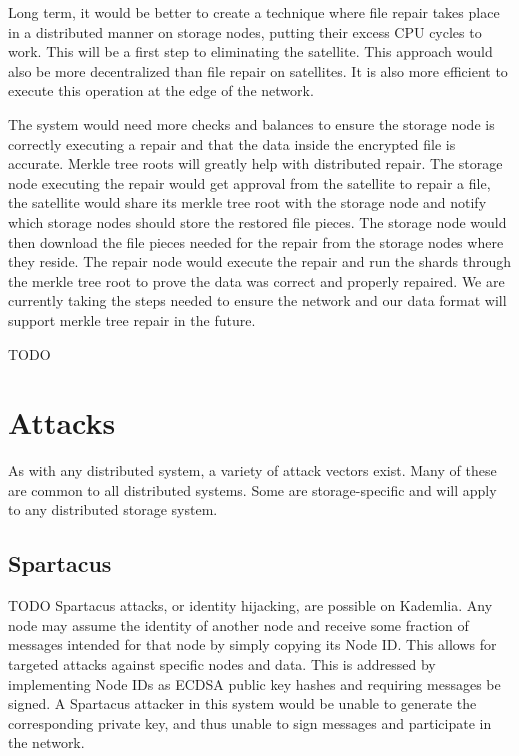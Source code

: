\documentclass[a4paper,10pt]{article} \usepackage[utf8]{inputenc}
\newcommand{\todo}[1]{{\color{red} TODO #1 }}
\begin{document}
Long term, it would be better to create a technique where file repair takes
place in a distributed manner on storage nodes, putting their excess CPU 
cycles
to work. This will be a first step to eliminating the satellite. This
approach would also be more decentralized than file repair on satellites. It
is also more efficient to execute this operation at the edge of the network.

The system would need more checks and balances to ensure the storage node is 
correctly
executing a repair and that the data inside the encrypted file is accurate.
Merkle tree roots will greatly help with distributed repair. The storage 
node
executing the repair would get approval from the satellite to repair a file,
the satellite would share its merkle tree root with the storage node and 
notify
which storage nodes should store the restored file pieces. The storage node 
would then
download the file pieces needed for the repair from the storage nodes where they
reside. The repair node would execute the repair and run the shards
through the merkle tree root to prove the data was correct and properly
repaired. We are currently taking the steps needed to ensure the network and our
data format will support merkle tree repair in the future.

\todo{}

\newpage \appendix

\section{Attacks}

As with any distributed system, a variety of attack vectors exist. Many of these
are common to all distributed systems. Some are storage-specific and will apply
to any distributed storage system.

\subsection{Spartacus}

\todo{ Spartacus attacks, or identity hijacking, are possible on Kademlia. Any
node may assume the identity of another node and receive some fraction of
messages intended for that node by simply copying its Node ID. This allows for
targeted attacks against specific nodes and data. This is addressed by
implementing Node IDs as ECDSA public key hashes and requiring messages be
signed. A Spartacus attacker in this system would be unable to generate the
corresponding private key, and thus unable to sign messages and participate in
the network. }
\end{document}
